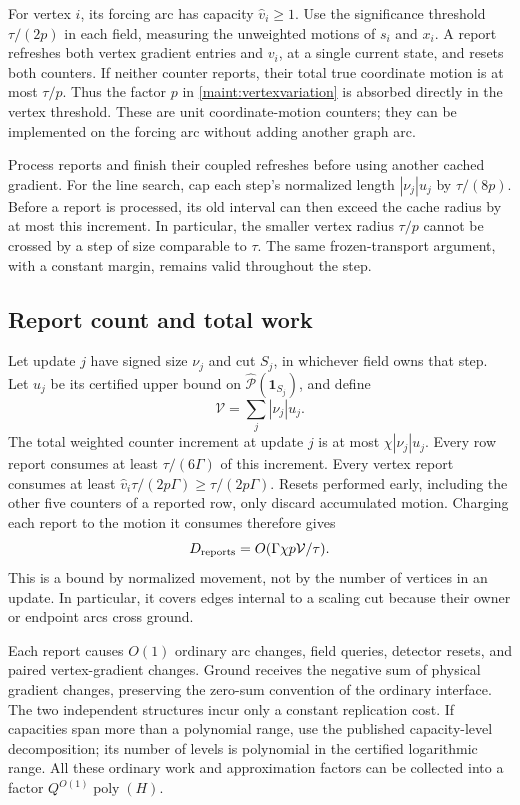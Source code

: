 \documentclass[11pt]{article}
\theoremstyle{definition}\newtheorem{definition}[theorem]{Definition}
\theoremstyle{remark}\newtheorem{remark}[theorem]{Remark}
\begin{document}
For vertex $i$, its forcing arc has capacity $\widehat v_i\geq1$.
Use the significance threshold $\tau/(2p)$ in each field, measuring the
unweighted motions of $s_i$ and $x_i$. A report refreshes both vertex
gradient entries and $v_i$, at a single current state, and resets both
counters. If neither counter reports, their total true coordinate
motion is at most $\tau/p$. Thus the factor $p$ in
\eqref{maint:vertexvariation} is absorbed directly in the vertex
threshold. These are unit coordinate-motion counters; they can be
implemented on the forcing arc without adding another graph arc.

Process reports and finish their coupled refreshes before using another
cached gradient. For the line search, cap each step's normalized
length $|\nu_j|u_j$ by $\tau/(8p)$. Before a
report is processed, its old interval can then exceed the cache radius
by at most this increment. In particular, the smaller vertex radius
$\tau/p$ cannot be crossed by a step of size comparable to $\tau$.
The same frozen-transport argument, with a constant margin, remains
valid throughout the step.

\subsection{Report count and total work}

Let update $j$ have signed size $\nu_j$ and cut $S_j$, in whichever
field owns that step. Let $u_j$ be its certified upper bound on
$\widehat{\mathcal P}(\mathbf1_{S_j})$, and define
\begin{equation}
 \mathcal V=\sum_j|\nu_j|u_j.
 \label{maint:totalmotion}
\end{equation}
The total weighted counter increment at update $j$ is at most
$\chi|\nu_j|u_j$. Every row report consumes at least
$\tau/(6\Gamma)$ of this increment. Every vertex report consumes at
least $\widehat v_i\tau/(2p\Gamma)\geq\tau/(2p\Gamma)$.
Resets performed early, including the other five counters of a reported
row, only discard accumulated motion. Charging each report to the
motion it consumes therefore gives
\begin{equation}
 D_{\rm reports}=O(\Gamma\chi p\mathcal V/\tau).
 \label{maint:reportbound}
\end{equation}
This is a bound by normalized movement, not by the number of vertices
in an update. In particular, it covers edges internal to a scaling cut
because their owner or endpoint arcs cross ground.

Each report causes $O(1)$ ordinary arc changes, field queries, detector
resets, and paired vertex-gradient changes. Ground receives the negative
sum of physical gradient changes, preserving the zero-sum convention of
the ordinary interface. The two independent structures incur only a
constant replication cost. If capacities span more than a polynomial
range, use the published capacity-level decomposition; its number of
levels is polynomial in the certified logarithmic range. All these
ordinary work and approximation factors can be collected into a factor
$Q^{O(1)}\operatorname{poly}(H)$.
\end{document}
